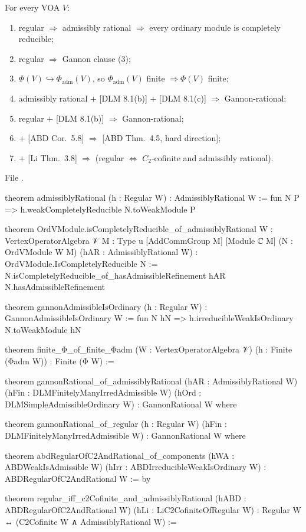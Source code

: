 \begin{theorem}\label{l12:thm:lattice}
For every VOA $V$:
\begin{enumerate}
\item regular $\Rightarrow$ admissibly rational $\Rightarrow$ every ordinary module is completely reducible;
\item regular $\Rightarrow$ Gannon clause (3);
\item $\Phi(V)\hookrightarrow\Phi_{\mathrm{adm}}(V)$, so $\Phi_{\mathrm{adm}}(V)$ finite $\Rightarrow\Phi(V)$ finite;
\item admissibly rational $+$ [DLM 8.1(b)] $+$ [DLM 8.1(c)] $\Rightarrow$ Gannon-rational;
\item regular $+$ [DLM 8.1(b)] $\Rightarrow$ Gannon-rational;
\item [ABD Prop.~5.7] $+$ [ABD Cor.~5.8] $\Rightarrow$ [ABD Thm.~4.5, hard direction];
\item [ABD Thm.~4.5] $+$ [Li Thm.~3.8] $\Rightarrow$ (regular $\iff$ $C_2$-cofinite and admissibly rational).
\end{enumerate}
\end{theorem}
\noindent File .
\begin{leancode}
theorem admissiblyRational (h : Regular W) : AdmissiblyRational W :=
  fun N P => h.weakCompletelyReducible N.toWeakModule P

theorem OrdVModule.isCompletelyReducible_of_admissiblyRational {W : VertexOperatorAlgebra 𝒱}
    {M : Type u} [AddCommGroup M] [Module ℂ M] (N : OrdVModule W M)
    (hAR : AdmissiblyRational W) : OrdVModule.IsCompletelyReducible N :=
  N.isCompletelyReducible_of_hasAdmissibleRefinement hAR N.hasAdmissibleRefinement

theorem gannonAdmissibleIsOrdinary (h : Regular W) : GannonAdmissibleIsOrdinary W :=
  fun N hN => h.irreducibleWeakIsOrdinary N.toWeakModule hN

theorem finite_Φ_of_finite_Φadm (W : VertexOperatorAlgebra 𝒱) (h : Finite (Φadm W)) :
    Finite (Φ W) :=

theorem gannonRational_of_admissiblyRational (hAR : AdmissiblyRational W)
    (hFin : DLMFinitelyManyIrredAdmissible W) (hOrd : DLMSimpleAdmissibleOrdinary W) :
    GannonRational W where

theorem gannonRational_of_regular (h : Regular W)
    (hFin : DLMFinitelyManyIrredAdmissible W) : GannonRational W where

theorem abdRegularOfC2AndRational_of_components (hWA : ABDWeakIsAdmissible W)
    (hIrr : ABDIrreducibleWeakIsOrdinary W) : ABDRegularOfC2AndRational W := by

theorem regular_iff_c2Cofinite_and_admissiblyRational (hABD : ABDRegularOfC2AndRational W)
    (hLi : LiC2CofiniteOfRegular W) :
    Regular W ↔ (C2Cofinite W ∧ AdmissiblyRational W) :=
\end{leancode}

